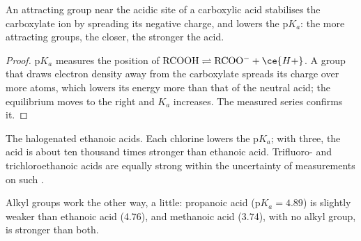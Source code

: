 \begin{proposition}\label{prop:b1:electronic-effects:inductive-pka}
An attracting group near the acidic site of a carboxylic acid
stabilises the carboxylate ion by spreading its negative charge, and
lowers the $\mathrm{p}K_a$: the more attracting groups, the closer, the
stronger the acid.
\end{proposition}

\begin{proof}
$\mathrm{p}K_a$ measures the position of $\mathrm{RCOOH} \rightleftharpoons
\mathrm{RCOO^-} + \ce{H+}$. A group that draws electron density away from
the carboxylate spreads its charge over more atoms, which lowers its
energy more than that of the neutral acid; the equilibrium moves to the
right and $K_a$ increases. The measured series confirms it.
\end{proof}

\begin{omfigure}

{\small The halogenated ethanoic acids. Each chlorine lowers the
$\mathrm{p}K_a$; with three, the acid is about ten thousand times
stronger than ethanoic acid. Trifluoro- and trichloroethanoic acids
are equally strong within the uncertainty of measurements on such .}
\end{omfigure}

Alkyl groups work the other way, a little: propanoic acid ($\mathrm{p}K_a
= 4.89$) is slightly weaker than ethanoic acid (4.76), and methanoic acid
(3.74), with no alkyl group, is stronger than both.


